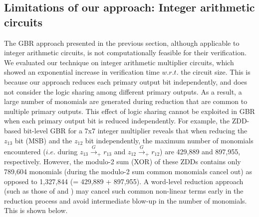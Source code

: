 \subsection{Limitations of our approach: Integer arithmetic circuits}
The GBR approach presented in the previous section, although
applicable to integer arithmetic circuits, is not computationally
feasible for their verification. 
We evaluated  our technique on integer arithmetic multiplier
circuits, which showed an  exponential increase in verification time
$w.r.t.$ the circuit size. This is because our approach reduces 
each primary output bit independently, and does not consider the logic
sharing among different primary outputs. As a result, a large number
of monomials are generated during reduction that are common to 
multiple primary outputs. This effect of logic sharing cannot be
exploited in GBR when each primary output bit is reduced
independently. 
For example, the ZDD-based bit-level GBR for a 7x7 integer
multiplier reveals that when reducing the $z_{13}$ bit (MSB) and
the $z_{12}$ bit independently, the maximum number of monomials
encountered ($i.e.$ during $z_{13} \xrightarrow{G}_+ r_{13}$ and
$z_{12} \xrightarrow{G}_+ r_{12}$) are 429,889 and 897,955,
respectively.  However, the modulo-2 sum (XOR) of these ZDDs contains
only 789,604 monomials  (during the modulo-2 sum common monomials
cancel out) as opposed to 1,327,844 (= 429,889 + 897,955).
A word-level reduction approach (such as those of
\cite{ciesielski:dac2015} and \cite{rolf:date16}) may cancel such
common non-linear terms early in the reduction process and avoid
intermediate blow-up in the number of monomials. This is shown below.
